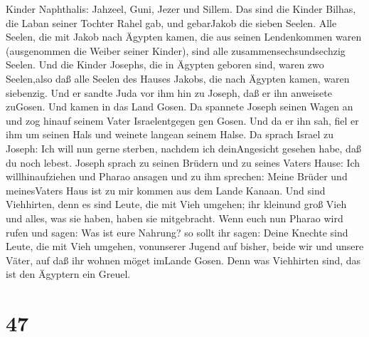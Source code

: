Kinder Naphthalis: Jahzeel, Guni, Jezer und Sillem.  Das
sind die Kinder Bilhas, die Laban seiner Tochter Rahel gab, und
gebarJakob die sieben Seelen.  Alle Seelen, die mit Jakob
nach Ägypten kamen, die aus seinen Lendenkommen waren (ausgenommen die
Weiber seiner Kinder), sind alle zusammensechsundsechzig Seelen.
 Und die Kinder Josephs, die in Ägypten geboren sind, waren
zwo Seelen,also daß alle Seelen des Hauses Jakobs, die nach Ägypten
kamen, waren siebenzig.  Und er sandte Juda vor ihm hin zu
Joseph, daß er ihn anweisete zuGosen. Und kamen in das Land Gosen.
 Da spannete Joseph seinen Wagen an und zog hinauf seinem
Vater Israelentgegen gen Gosen. Und da er ihn sah, fiel er ihm um seinen
Hals und weinete langean seinem Halse.  Da sprach Israel zu
Joseph: Ich will nun gerne sterben, nachdem ich deinAngesicht gesehen
habe, daß du noch lebest.  Joseph sprach zu seinen Brüdern
und zu seines Vaters Hause: Ich willhinaufziehen und Pharao ansagen und
zu ihm sprechen: Meine Brüder und meinesVaters Haus ist zu mir kommen
aus dem Lande Kanaan.  Und sind Viehhirten, denn es sind
Leute, die mit Vieh umgehen; ihr kleinund groß Vieh und alles, was sie
haben, haben sie mitgebracht.  Wenn euch nun Pharao wird
rufen und sagen: Was ist eure Nahrung?  so sollt ihr sagen:
Deine Knechte sind Leute, die mit Vieh umgehen, vonunserer Jugend auf
bisher, beide wir und unsere Väter, auf daß ihr wohnen möget imLande
Gosen. Denn was Viehhirten sind, das ist den Ägyptern ein Greuel.

\hypertarget{section-46}{%
\section{47}\label{section-46}}

